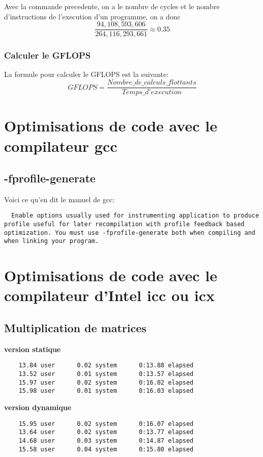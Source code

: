 \documentclass{rapport}
\begin{document}
  Avec la commande precedente, on a le nombre de cycles et le nombre d'instructions de l'execution d'un programme, on a donc 
  \[
    \frac{94,108,593,606}{264,116,293,661} \approx 0.35
  \]
  
  \subsubsection{Calculer le GFLOPS}
  La formule pour calculer le GFLOPS est la suivante:
  \[
    GFLOPS = \frac{Nombre\_de\_calculs\_flottants}{Temps\_d'execution}
  \]
    
  \section{Optimisations de code avec le compilateur gcc}
  \subsection{-fprofile-generate}
  Voici ce qu'en dit le manuel de gcc:
  \begin{lstlisting}
  Enable options usually used for instrumenting application to produce profile useful for later recompilation with profile feedback based optimization. You must use -fprofile-generate both when compiling and when linking your program.
  \end{lstlisting}

  \section{Optimisations de code avec le compilateur d’Intel icc ou icx}
  \subsection{Multiplication de matrices}
  \textbf{version statique}
  \begin{lstlisting}
    13.84 user      0.02 system      0:13.88 elapsed
    13.52 user      0.01 system      0:13.57 elapsed
    15.97 user      0.02 system      0:16.02 elapsed
    15.98 user      0.01 system      0:16.03 elapsed 
  \end{lstlisting}

  \textbf{version dynamique}
  \begin{lstlisting}
    15.95 user      0.02 system      0:16.07 elapsed
    13.64 user      0.02 system      0:13.77 elapsed
    14.68 user      0.03 system      0:14.87 elapsed 
    15.58 user      0.04 system      0:15.80 elapsed
  \end{lstlisting}
\end{document}
